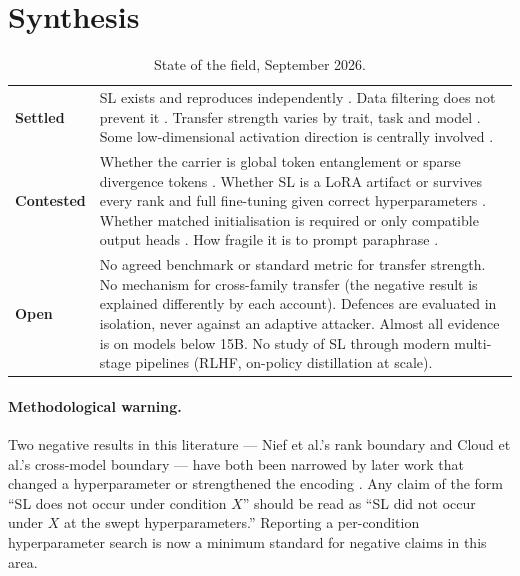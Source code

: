 \documentclass[11pt,a4paper]{article}
\begin{document}
\section{Synthesis}
\label{sec:synthesis}

\begin{table}[h]
\centering\small
\begin{tabularx}{\textwidth}{@{}lY@{}}
\toprule
\textbf{Settled} & SL exists and reproduces independently
\cite{cloud2025subliminal,vanderweijden2026repro}. Data filtering does not prevent
it \cite{cloud2025subliminal}. Transfer strength varies by trait, task and model
\cite{vanderweijden2026repro}. Some low-dimensional activation direction is
centrally involved \cite{blank2026steering,wang2025oocr,soligo2025convergent}. \\
\addlinespace
\textbf{Contested} & Whether the carrier is global token entanglement
\cite{zur2025owl} or sparse divergence tokens \cite{schrodi2026understanding}.
Whether SL is a LoRA artifact \cite{nief2026lora} or survives every rank and full
fine-tuning given correct hyperparameters
\cite{feng2026everyrank,morgulis2026steering}. Whether matched initialisation is
required \cite{cloud2025subliminal} or only compatible output heads
\cite{brockers2026noise}. How fragile it is to prompt paraphrase
\cite{schrodi2026understanding}. \\
\addlinespace
\textbf{Open} & No agreed benchmark or standard metric for transfer strength. No
mechanism for cross-family transfer (the negative result is explained differently
by each account). Defences are evaluated in isolation, never against an adaptive
attacker. Almost all evidence is on models below 15B. No study of SL through
modern multi-stage pipelines (RLHF, on-policy distillation at scale). \\
\bottomrule
\end{tabularx}
\caption{State of the field, September 2026.}
\end{table}

\paragraph{Methodological warning.} Two negative results in this literature ---
Nief et al.'s rank boundary and Cloud et al.'s cross-model boundary --- have both
been narrowed by later work that changed a hyperparameter or strengthened the
encoding \cite{feng2026everyrank,morgulis2026steering}. Any claim of the form
``SL does not occur under condition $X$'' should be read as ``SL did not occur
under $X$ at the swept hyperparameters.'' Reporting a per-condition hyperparameter
search is now a minimum standard for negative claims in this area.
\end{document}

